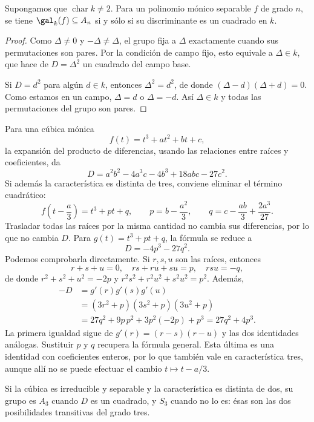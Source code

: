 \begin{lema}\label{lema:C27-discriminante}
Supongamos que $\operatorname{char}k\ne2$. Para un polinomio mónico separable $f$ de grado $n$, se tiene $\gal_k(f)\subseteq A_n$ si y sólo si su discriminante es un cuadrado en $k$.
\end{lema}
\begin{proof}
Como $\Delta\ne0$ y $-\Delta\ne\Delta$, el grupo fija a $\Delta$ exactamente cuando sus permutaciones son pares. Por la condición de campo fijo, esto equivale a $\Delta\in k$, que hace de $D=\Delta^2$ un cuadrado del campo base.

Si $D=d^2$ para algún $d\in k$, entonces $\Delta^2=d^2$, de donde $(\Delta-d)(\Delta+d)=0$. Como estamos en un campo, $\Delta=d$ o $\Delta=-d$. Así $\Delta\in k$ y todas las permutaciones del grupo son pares.
\end{proof}

Para una cúbica mónica
\[
f(t)=t^3+at^2+bt+c,
\]
la expansión del producto de diferencias, usando las relaciones entre raíces y coeficientes, da
\[
D=a^2b^2-4a^3c-4b^3+18abc-27c^2.
\]
Si además la característica es distinta de tres, conviene eliminar el término cuadrático:
\[
f\left(t-\frac a3\right)=t^3+pt+q,
\qquad p=b-\frac{a^2}{3},\qquad q=c-\frac{ab}{3}+\frac{2a^3}{27}.
\]
Trasladar todas las raíces por la misma cantidad no cambia sus diferencias, por lo que no cambia $D$. Para $g(t)=t^3+pt+q$, la fórmula se reduce a
\[
D=-4p^3-27q^2.
\]
Podemos comprobarla directamente. Si $r,s,u$ son las raíces, entonces
\[
r+s+u=0,\quad rs+ru+su=p,\quad rsu=-q,
\]
de donde $r^2+s^2+u^2=-2p$ y $r^2s^2+r^2u^2+s^2u^2=p^2$. Además,
\[
\begin{aligned}
-D&=g'(r)g'(s)g'(u)\\
&=(3r^2+p)(3s^2+p)(3u^2+p)\\
&=27q^2+9p\,p^2+3p^2(-2p)+p^3
=27q^2+4p^3.
\end{aligned}
\]
La primera igualdad sigue de $g'(r)=(r-s)(r-u)$ y las dos identidades análogas. Sustituir $p$ y $q$ recupera la fórmula general. Esta última es una identidad con coeficientes enteros, por lo que también vale en característica tres, aunque allí no se puede efectuar el cambio $t\mapsto t-a/3$.

Si la cúbica es irreducible y separable y la característica es distinta de dos, su grupo es $A_3$ cuando $D$ es un cuadrado, y $S_3$ cuando no lo es: ésas son las dos posibilidades transitivas del grado tres.

